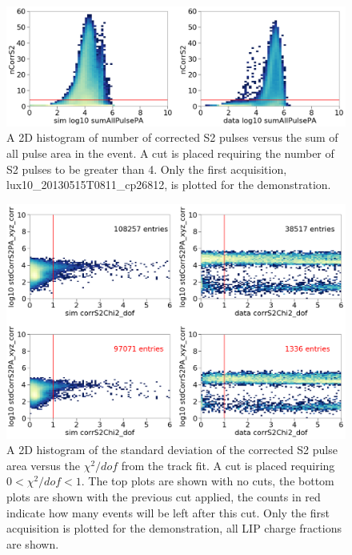 \begin{figure}[htbp]
\begin{center}
\includegraphics[width=\textwidth]{figures/lips/cut0.png}
\caption{ A 2D histogram of number of corrected S2 pulses versus the sum of all pulse area in the event. A cut is placed requiring the number of S2 pulses to be greater than 4. Only the first acquisition, lux10\_20130515T0811\_cp26812, is plotted for the demonstration.}
\label{fig:cut0}
\end{center}
\end{figure}

\begin{figure}[htbp]
\begin{center}
\includegraphics[width=\textwidth]{figures/lips/cut1.png}
\caption{A 2D histogram of the standard deviation of the corrected S2 pulse area versus the $\chi^{2}/dof$ from the track fit. A cut is placed requiring  $0 < \chi^{2}/dof < 1$. The top plots are shown with no cuts, the bottom plots are shown with the previous cut applied, the counts in red indicate how many events will be left after this cut. Only the first acquisition is plotted for the demonstration, all \acs{LIP} charge fractions are shown. }
\label{fig:cut1}
\end{center}
\end{figure}

